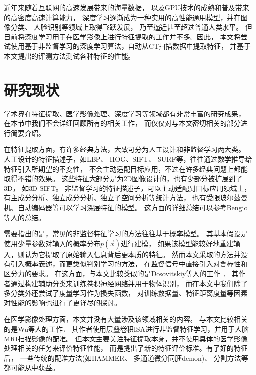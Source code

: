 近年来随着互联网的高速发展带来的海量数据，
以及GPU技术的成熟和普及带来的高密度高速计算能力，
深度学习逐渐成为一种实用的高性能通用模型，并在图像分类\cite{he2015delving}、
人脸识别\cite{schroff2015facenet}等领域上取得飞跃发展，
乃至逼近甚至超过普通人类水平。
但目前将深度学习用于在医学影像上进行特征提取的工作并不多。因此，
本文将尝试使用基于非监督学习的深度学习算法，自动从CT扫描数据中提取特征，
并基于本文提出的评测方法测试各种特征的性能。

\section{研究现状}
学术界在特征提取、医学影像处理、深度学习等领域都有非常丰富的研究成果，
在本节中我们不会详细回顾所有的相关工作，
而仅仅对与本文密切相关的部分进行简要介绍。

在特征提取方面，有许多经典方法，大致可分为人工设计和非监督学习两大类。
人工设计的特征描述子，如LBP\cite{ojala1994performance}、
HOG\cite{dalal2005histograms}、SIFT\cite{lowe1999object}、
SURF\cite{bay2006surf}等，往往通过数学推导给特征引入所期望的不变性，
不会主动适配目标应用，不过在许多经典问题上都能取得不错的效果。
这些特征大部分是为2D图像设计的，也有少部分被扩展到了3D，
如3D-SIFT\cite{scovanner20073}。
非监督学习的特征描述子，可以主动适配到目标应用领域上，
有主成分分析、独立成分分析、独立子空间分析等统计方法，
也有受限玻尔兹曼机、自动编码器等可以学习深层特征的模型。
这方面的详细总结可以参考Bengio等人的总结\cite{bengio2013representation}。

需要指出的是，常见的非监督特征学习的方法往往基于概率模型。
其基本假设是使用少量参数对输入的概率分布$p(\vec{x})$进行建模，
如果该模型能较好地重建输入，则认为它提取了原始输入信息背后更本质的特征。
然而本文采取的方法并没有引入概率表述，而更类似判别学习的方法，
在监督信号中直接引入对鲁棒性和区分力的要求。
在这方面，与本文比较类似的是Dosovitskiy等人的工作
\cite{dosovitskiy2014discriminative}，
其作者通过构建辅助分类来训练卷积神经网络并用于物体识别，
而在本文中我们除了多分类外还尝试了度量学习作为损失函数，
对训练数据量、特征距离度量等因素对性能的影响也进行了更详尽的探讨。

在医学影像处理方面，本文并没有大量涉及该领域相关的内容。
与本文比较相关的是Wu等人的工作\cite{wu2013unsupervised}，
其作者使用层叠卷积ISA进行非监督特征学习，并用于人脑MRI扫描影像的配准。
但本文主要关注特征提取本身，并不使用具体的医学影像处理相关的任务来评价特征性能，
而是提出了新的特征评价标准。有了好的特征后，
一些传统的配准方法(如HAMMER\cite{shen2002hammer}、
多通道微分同胚demon\cite{peyrat2010registration})、
分割方法等都可能从中获益。

